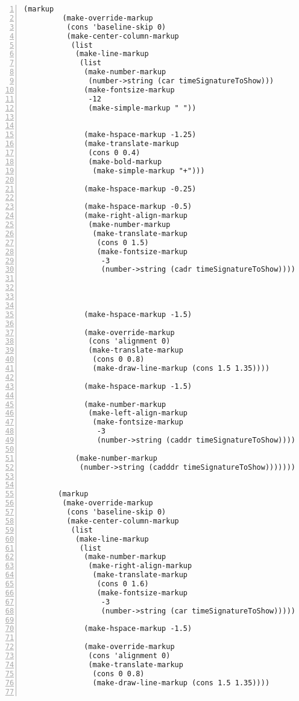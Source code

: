 \begin{Verbatim}[numbers=left,xleftmargin=5mm]
        (markup
         (make-override-markup
          (cons 'baseline-skip 0)
          (make-center-column-markup
           (list
            (make-line-markup
             (list
              (make-number-markup
               (number->string (car timeSignatureToShow)))
              (make-fontsize-markup
               -12
               (make-simple-markup " "))


              (make-hspace-markup -1.25)
              (make-translate-markup
               (cons 0 0.4)
               (make-bold-markup
                (make-simple-markup "+")))

              (make-hspace-markup -0.25)

              (make-hspace-markup -0.5)
              (make-right-align-markup
               (make-number-markup
                (make-translate-markup
                 (cons 0 1.5)
                 (make-fontsize-markup
                  -3
                  (number->string (cadr timeSignatureToShow))))))




              (make-hspace-markup -1.5)

              (make-override-markup
               (cons 'alignment 0)
               (make-translate-markup
                (cons 0 0.8)
                (make-draw-line-markup (cons 1.5 1.35))))

              (make-hspace-markup -1.5)

              (make-number-markup
               (make-left-align-markup
                (make-fontsize-markup
                 -3
                 (number->string (caddr timeSignatureToShow)))))))

            (make-number-markup
             (number->string (cadddr timeSignatureToShow)))))))


        (markup
         (make-override-markup
          (cons 'baseline-skip 0)
          (make-center-column-markup
           (list
            (make-line-markup
             (list
              (make-number-markup
               (make-right-align-markup
                (make-translate-markup
                 (cons 0 1.6)
                 (make-fontsize-markup
                  -3
                  (number->string (car timeSignatureToShow))))))

              (make-hspace-markup -1.5)

              (make-override-markup
               (cons 'alignment 0)
               (make-translate-markup
                (cons 0 0.8)
                (make-draw-line-markup (cons 1.5 1.35))))


\end{Verbatim}
